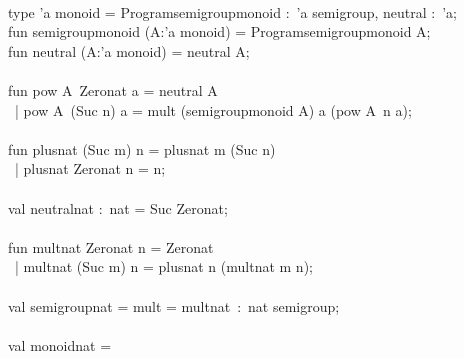 \begin{isabellebody}
\begin{isamarkuptext}
\hspace*{0pt}\\
\hspace*{0pt}type 'a monoid = {}Program{}{}semigroup{}monoid :~'a semigroup, neutral :~'a{};\\
\hspace*{0pt}fun semigroup{}monoid (A{}:'a monoid) = {}Program{}{}semigroup{}monoid A{};\\
\hspace*{0pt}fun neutral (A{}:'a monoid) = {}neutral A{};\\
\hspace*{0pt}\\
\hspace*{0pt}fun pow A{}~Zero{}nat a = neutral A{}\\
\hspace*{0pt} ~| pow A{}~(Suc n) a = mult (semigroup{}monoid A{}) a (pow A{}~n a);\\
\hspace*{0pt}\\
\hspace*{0pt}fun plus{}nat (Suc m) n = plus{}nat m (Suc n)\\
\hspace*{0pt} ~| plus{}nat Zero{}nat n = n;\\
\hspace*{0pt}\\
\hspace*{0pt}val neutral{}nat :~nat = Suc Zero{}nat;\\
\hspace*{0pt}\\
\hspace*{0pt}fun mult{}nat Zero{}nat n = Zero{}nat\\
\hspace*{0pt} ~| mult{}nat (Suc m) n = plus{}nat n (mult{}nat m n);\\
\hspace*{0pt}\\
\hspace*{0pt}val semigroup{}nat = {}mult = mult{}nat{}~:~nat semigroup;\\
\hspace*{0pt}\\
\hspace*{0pt}val monoid{}nat =\\

\end{isamarkuptext}
\end{isabellebody}
